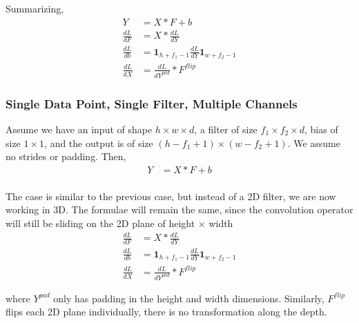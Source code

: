 \documentclass[../../deep_learning_notes.tex]{subfiles}
\begin{document}
Summarizing,
\begin{align*}
    Y &= X * F + b\\
    \frac{dL}{dF} &= X * \frac{dL}{dY}\\
    \frac{dL}{db} &= \bm{1}_{h+f_{1}-1}\frac{dL}{dY}\bm{1}_{w+f_{2}-1}\\
    \frac{dL}{dX} &= \frac{dL}{dY^{pad}} * F^{flip}
\end{align*}


\subsubsection{Single Data Point, Single Filter, Multiple Channels}
Assume we have an input of shape $h \times w \times d$, a filter of size $f_{1} \times f_{2} \times d$, bias of size $1 \times 1$, and the output is of size $(h - f_{1} + 1) \times (w - f_{2} + 1)$. We assume no strides or padding. Then,
\begin{align*}
    Y &= X * F + b\\
\end{align*}

The case is similar to the previous case, but instead of a 2D filter, we are now working in 3D. The formulae will remain the same, since the convolution operator will still be sliding on the 2D plane of height $\times$ width
\begin{align*}
    \frac{dL}{dF} &= X * \frac{dL}{dY}\\
    \frac{dL}{db} &= \bm{1}_{h+f_{1}-1}\frac{dL}{dY}\bm{1}_{w+f_{2}-1}\\
    \frac{dL}{dX} &= \frac{dL}{dY^{pad}} * F^{flip}
\end{align*}

where $Y^{pad}$ only has padding in the height and width dimensions. Similarly, $F^{flip}$ flips each 2D plane individually, there is no transformation along the depth.


\end{document}
